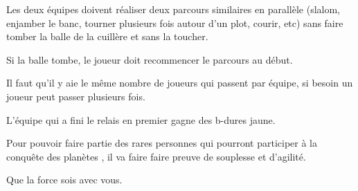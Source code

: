 \documentclass{grand-jeu}
\begin{document}
\begin{liste-materiel}
\end{liste-materiel}

\begin{regles}
Les deux équipes doivent réaliser deux parcours similaires en parallèle (slalom, enjamber le banc, tourner plusieurs fois autour d'un plot, courir, etc) sans faire tomber la balle de la cuillère et sans la toucher. 

Si la balle tombe, le joueur doit recommencer le parcours au début.

Il faut qu'il y aie le même nombre de joueurs qui passent par équipe, si besoin un joueur peut passer plusieurs fois.

L'équipe qui a fini le relais en premier gagne des b-dures jaune. 
\end{regles}

\begin{imaginaire}

Pour pouvoir faire partie des rares personnes qui pourront participer à la conquête des planètes , il va faire faire preuve de souplesse et d'agilité. 

\vspace{0.2cm}

Que la force sois avec vous.

\end{imaginaire}

\begin{moments-stop}
\end{moments-stop}
\end{document}
